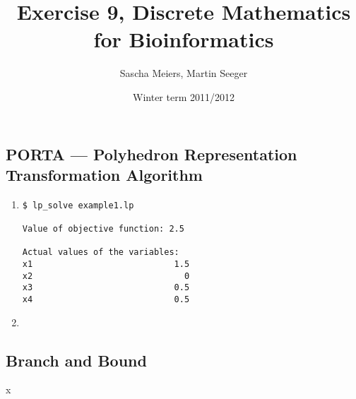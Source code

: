 \documentclass[a4paper, oneside]{scrartcl}
\author{Sascha Meiers, Martin Seeger}
\title{Exercise 9, Discrete Mathematics for Bioinformatics}
\date{Winter term 2011/2012}
\begin{document}
\maketitle


\subsection{PORTA --- Polyhedron Representation Transformation Algorithm}

\renewcommand{\labelenumi}{\alph{enumi})}
\begin{enumerate}
  \item 
\begin{verbatim}
$ lp_solve example1.lp 

Value of objective function: 2.5

Actual values of the variables:
x1                            1.5
x2                              0
x3                            0.5
x4                            0.5
\end{verbatim}

  \item 
\end{enumerate}

\subsection{Branch and Bound}

x
\end{document}
